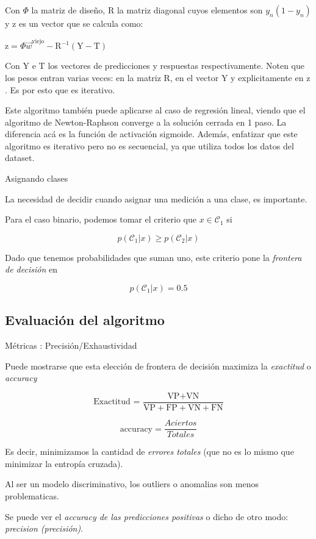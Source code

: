 \documentclass[twoside,11pt]{article}
\begin{document}
Con $\Phi$ la matriz de diseño, $\text{R}$ la matriz diagonal cuyos elementos son $y_{n}(1-y_{n})$ y $\text{z}$ 
es un vector que se calcula como:

$\text{z}=\Phi\vec{w}^{\text{viejo}}-\text{R}^{-1}(\text{Y}-\text{T})$

Con $\text{Y}$ e $\text{T}$ los vectores de predicciones y respuestas respectivamente. 
Noten que los pesos entran varias veces: en la matriz $\text{R}$, en el vector $\text{Y}$ y 
explicitamente en $\text{z}$. Es por esto que es iterativo.

Este algoritmo también puede aplicarse al caso de regresión lineal, viendo que el algoritmo 
de Newton-Raphson converge a la solución cerrada en 1 paso. La diferencia acá es la función 
de activación sigmoide. Además, enfatizar que este algoritmo es iterativo pero no es secuencial, 
ya que utiliza todos los datos del dataset.

Asignando clases

La necesidad de decidir cuando asignar una medición a una clase, es importante.

Para el caso binario, podemos tomar el criterio que $x\in\mathcal{C}_1$ si

$$p(\mathcal{C}_{1}|x)\geq p(\mathcal{C}_{2}|x)$$

Dado que tenemos probabilidades que suman uno, este criterio pone la \textit{frontera de decisión} en

$$p(\mathcal{C}_{1}|x)=0.5$$

\subsection{Evaluación del algoritmo}

Métricas : Precisión/Exhaustividad

Puede mostrarse que esta elección de frontera de decisión maximiza la \textit{exactitud} o \textit{accuracy}

$$\text{Exactitud = }\frac{\text{VP}+\text{VN}}{\text{VP}+\text{FP}+\text{VN}+\text{FN}}$$

$$
\mathrm{accuracy} = \frac{Aciertos}{Totales}
$$

Es decir, minimizamos la cantidad de \textit{errores totales} (que no es lo mismo que minimizar la entropía cruzada).

Al ser un modelo discriminativo, los outliers o anomalias son menos problematicas.

Se puede ver el \textit{accuracy de las predicciones positivas} o dicho de otro modo: \textit{precision (precisión)}.
\end{document}
